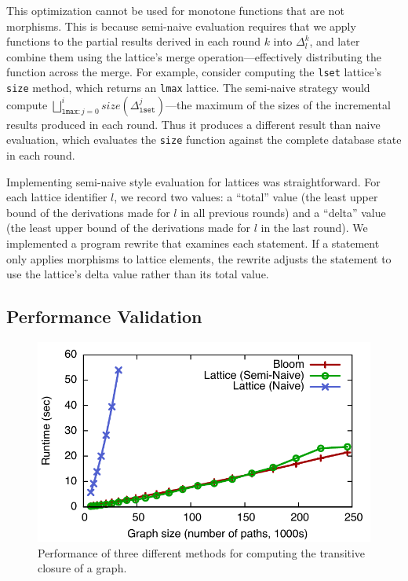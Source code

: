 This optimization cannot be used for monotone functions that are not
morphisms. This is because semi-naive evaluation requires that we apply
functions to the partial results derived in each round $k$ into $\Delta_l^k$,
and later combine them using the lattice's merge operation---effectively
distributing the function across the merge.  For example, consider computing the
\texttt{lset} lattice's \texttt{size} method, which returns an \texttt{lmax}
lattice. The semi-naive strategy would compute
$\bigsqcup_{\mathtt{lmax}:j=0}^i size(\Delta^j_{\mathtt{lset}})$---the maximum of
the sizes of the incremental results produced in each round.  Thus it produces a
different result than naive evaluation, which evaluates the \texttt{size}
function against the complete database state in each round.

Implementing semi-naive style evaluation for lattices was straightforward. For
each lattice identifier $l$, we record two values: a ``total'' value (the least
upper bound of the derivations made for $l$ in all previous rounds) and a
``delta'' value (the least upper bound of the derivations made for $l$ in the
last round). We implemented a program rewrite that examines each \lang
statement. If a statement only applies morphisms to lattice elements, the
rewrite adjusts the statement to use the lattice's delta value rather than its
total value.

\subsection{Performance Validation}
\label{sec:lattice-perf}

\begin{figure}[t]
\centering
\includegraphics[width=\linewidth]{fig/sn_perf}
\caption{Performance of three different methods for computing the
  transitive closure of a graph.}
\label{fig:tc-perf-graph}
\end{figure}

